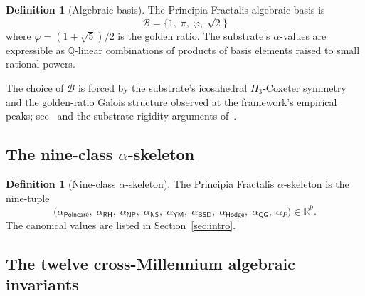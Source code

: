 \documentclass[11pt,a4paper]{amsart}
\theoremstyle{plain}
\theoremstyle{definition}
\newtheorem{definition}[theorem]{Definition}
\begin{document}
\begin{definition}[Algebraic basis]\label{def:basis}
The Principia Fractalis algebraic basis is
\[
\mathcal{B} = \{1,\;\pi,\;\varphi,\;\sqrt{2}\}
\]
where $\varphi=(1+\sqrt{5})/2$ is the golden ratio. The substrate's $\alpha$-values are expressible as $\mathbb{Q}$-linear combinations of products of basis elements raised to small rational powers.
\end{definition}

The choice of $\mathcal{B}$ is forced by the substrate's icosahedral $H_3$-Coxeter symmetry and the golden-ratio Galois structure observed at the framework's empirical peaks; see~\cite[Chapter~9]{cohen2026book} and the substrate-rigidity arguments of~\cite{cohen2025unifiedClay,cohen2026corroborating}.

\subsection{The nine-class \texorpdfstring{$\alpha$-skeleton}{alpha-skeleton}}\label{subsec:alpha-skeleton}

\begin{definition}[Nine-class $\alpha$-skeleton]\label{def:alpha-skeleton}
The Principia Fractalis $\alpha$-skeleton is the nine-tuple
\[
\bigl(\alpha_{\textsf{Poincar\'e}},\;\alpha_{\textsf{RH}},\;\alpha_{\textsf{NP}},\;\alpha_{\textsf{NS}},\;\alpha_{\textsf{YM}},\;\alpha_{\textsf{BSD}},\;\alpha_{\textsf{Hodge}},\;\alpha_{\textsf{QG}},\;\alpha_{P}\bigr) \in \mathbb{R}^9.
\]
The canonical values are listed in Section~\ref{sec:intro}.
\end{definition}

\subsection{The twelve cross-Millennium algebraic invariants}
\end{document}
